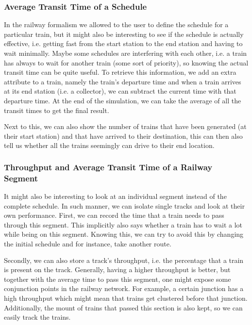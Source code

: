 \documentclass{article}
\begin{document}
\subsubsection{Average Transit Time of a Schedule}

In the railway formalism we allowed to the user to define the schedule for a particular train, but it might also be interesting to see if the schedule is actually effective, i.e. getting fast from the start station to the end station and having to wait minimally. Maybe some schedules are interfering with each other, i.e. a train has always to wait for another train (some sort of priority), so knowing the actual transit time can be quite useful. To retrieve this information, we add an extra attribute to a train, namely the train's departure time and when a train arrives at its end station (i.e. a collector), we can subtract the current time with that departure time. At the end of the simulation, we can take the average of all the transit times to get the final result.

Next to this, we can also show the number of trains that have been generated (at their start station) and that have arrived to their destination, this can then also tell us whether all the trains seemingly can drive to their end location.

\subsubsection{Throughput and Average Transit Time of a Railway Segment}

It might also be interesting to look at an individual segment instead of the complete schedule. In such manner, we can isolate single tracks and look at their own performance. First, we can record the time that a train needs to pass through this segment. This implicitly also says whether a train has to wait a lot while being on this segment. Knowing this, we can try to avoid this by changing the initial schedule and for instance, take another route.

Secondly, we can also store a track's throughput, i.e. the percentage that a train is present on the track. Generally, having a higher throughput is better, but together with the average time to pass this segment, one might expose some conjunction points in the railway network. For example, a certain junction has a high throughput which might mean that trains get clustered before that junction. Additionally, the mount of trains that passed this section is also kept, so we can easily track the trains.
\end{document}
